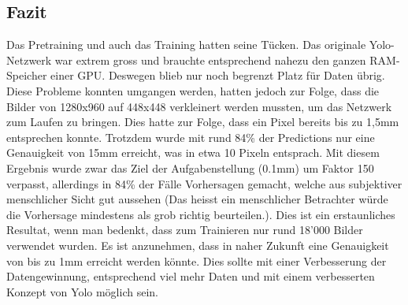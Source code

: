 \subsection*{Fazit}

Das Pretraining und auch das Training hatten seine Tücken.
Das originale Yolo-Netzwerk war extrem gross und brauchte entsprechend nahezu den ganzen RAM-Speicher einer GPU.
Deswegen blieb nur noch begrenzt Platz für Daten übrig. 
Diese Probleme konnten umgangen werden, hatten jedoch zur Folge, dass die Bilder von 1280x960 auf 448x448 verkleinert werden mussten, um das Netzwerk zum Laufen zu bringen. 
Dies hatte zur Folge, dass ein Pixel bereits bis zu 1,5mm entsprechen konnte.
Trotzdem wurde mit rund 84\% der Predictions nur eine Genauigkeit von 15mm erreicht, was in etwa 10 Pixeln entsprach. 
Mit diesem Ergebnis wurde zwar das Ziel der Aufgabenstellung (0.1mm) um Faktor 150 verpasst, allerdings in 84\% der Fälle Vorhersagen gemacht, welche aus subjektiver menschlicher Sicht \grqq{}gut\grqq{} aussehen (Das heisst ein menschlicher Betrachter würde die Vorhersage mindestens als grob richtig beurteilen.). 
Dies ist ein erstaunliches Resultat, wenn man bedenkt, dass zum Trainieren nur rund 18'000 Bilder verwendet wurden. 
Es ist anzunehmen, dass in naher Zukunft eine Genauigkeit von bis zu 1mm erreicht werden könnte. 
Dies sollte mit einer Verbesserung der Datengewinnung, entsprechend viel mehr Daten und mit einem verbesserten Konzept von Yolo möglich sein.
